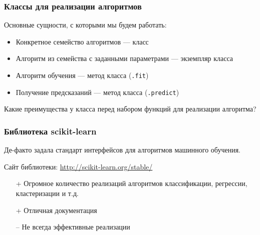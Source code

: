\documentclass[fleqn, xcolor=x11names, 11pt]{beamer}
\begin{document}
\begin{frame}[fragile]\frametitle{Классы для реализации алгоритмов}
Основные сущности, с которыми мы будем работать:

\begin{itemize}
    \item Конкретное семейство алгоритмов --- класс
    
    \item Алгоритм из семейства с заданными параметрами --- экземпляр класса 
    
    \item Алгоритм обучения --- метод класса (\texttt{.fit})
    
    \item Получение предсказаний --- метод класса (\texttt{.predict})
\end{itemize}

\hfill

Какие преимущества у класса перед набором функций для реализации алгоритма?
\end{frame}

\begin{frame}[fragile]\frametitle{Библиотека scikit-learn}
Де-факто задала стандарт интерфейсов для алгоритмов машинного обучения.

\hfill

Сайт библиотеки: \href{http://scikit-learn.org/stable/}{http://scikit-learn.org/stable/}

\begin{itemize}
    \item[+] Огромное количество реализаций алгоритмов классификации, регрессии, кластеризации и т.д.
    \item[+] Отличная документация
    \item[--] Не всегда эффективные реализации
\end{itemize}
\end{frame}

\section*{}
\end{document}
